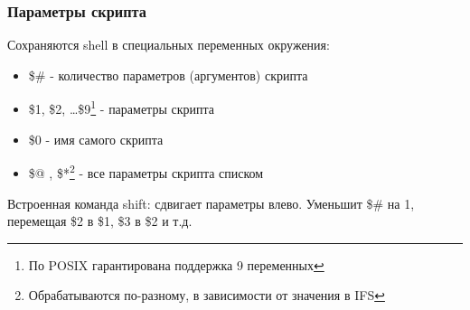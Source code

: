 \begin{frame}[fragile]
  \frametitle{Параметры скрипта}

  Сохраняются shell в специальных переменных окружения:
  \begin{itemize}
    \item \alert{\$\#} - количество параметров (аргументов) скрипта
    \item \alert{\$1, \$2, \ldots \$9}\footnote{По POSIX гарантирована поддержка 9 переменных} - параметры скрипта
      
\pause
    \item \alert{\$0} - имя самого скрипта
    \item \alert{\$@ , \$*}\footnote{Обрабатываются по-разному, в зависимости от значения в IFS} - все параметры скрипта списком 
  \end{itemize} \pause
  Встроенная команда \alert{shift}: сдвигает параметры влево. 
  Уменьшит \alert{\$\#} на 1, перемещая \alert{\$2} в \alert{\$1}, \alert{\$3} в \alert{\$2} и т.д.


\end{frame}
